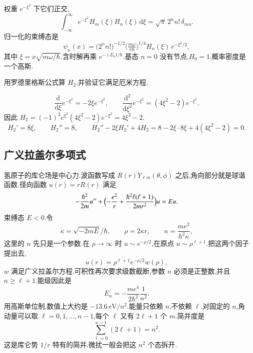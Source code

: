 权重 $e^{-\xi^2}$ 下它们正交,
\begin{equation}
  \int_{-\infty}^{\infty} e^{-\xi^2} H_m(\xi) H_n(\xi)\,\mathrm{d}\xi
  =\sqrt{\pi}\, 2^n n!\, \delta_{mn}.
\end{equation}
归一化的束缚态是
\begin{equation}
  \psi_n(x)
  =\bigl(2^n n!\bigr)^{-1/2}
    \bigl(\tfrac{m\omega}{\pi\hbar}\bigr)^{1/4}
    H_n(\xi)\, e^{-\xi^2/2},
\end{equation}
其中 $\xi=x\sqrt{m\omega/\hbar}$.含时解再乘 $e^{-\imath E_n t/\hbar}$.基态 $n=0$ 没有节点,$H_0=1$,概率密度是一个高斯.

\begin{example}
用罗德里格斯公式算 $H_2$,并验证它满足厄米方程.
\end{example}
\begin{solution}
\begin{equation}
  \frac{\mathrm{d}}{\mathrm{d}\xi}e^{-\xi^2}=-2\xi e^{-\xi^2},
  \qquad
  \frac{\mathrm{d}^2}{\mathrm{d}\xi^2}e^{-\xi^2}=(4\xi^2-2)e^{-\xi^2}.
\end{equation}
因此 $H_2=(-1)^2 e^{\xi^2}(4\xi^2-2)e^{-\xi^2}=4\xi^2-2$.
\begin{equation}
  H_2'=8\xi, \qquad H_2''=8,
  \qquad
  H_2''-2\xi H_2'+4 H_2=8-2\xi\cdot 8\xi+4(4\xi^2-2)=0.
\end{equation}
\end{solution}

\subsection{广义拉盖尔多项式}
氢原子的库仑场是中心力.波函数写成 $R(r)Y_{\ell m}(\theta,\phi)$ 之后,角向部分就是球谐函数.径向函数 $u(r)=r R(r)$ 满足
\begin{equation}
  -\frac{\hbar^2}{2m}u''
  +\Bigl(-\frac{e^2}{r}+\frac{\hbar^2\ell(\ell+1)}{2m r^2}\Bigr)u
  =E u.
\end{equation}
束缚态 $E<0$.令
\begin{equation}
  \kappa=\sqrt{-2mE}/\hbar,
  \qquad
  \rho=2\kappa r,
  \qquad
  n=\frac{m e^2}{\hbar^2\kappa},
\end{equation}
这里的 $n$ 先只是一个参数.在 $\rho\to\infty$ 时 $u\sim e^{-\rho/2}$,在原点 $u\sim\rho^{\ell+1}$.把这两个因子提出去,
\begin{equation}
  u(r)=\rho^{\ell+1} e^{-\rho/2} w(\rho),
\end{equation}
$w$ 满足广义拉盖尔方程.可积性再次要求级数截断,参数 $n$ 必须是正整数,并且 $n\geq\ell+1$.能级因此是
\begin{equation}
  E_n=-\frac{m e^4}{2\hbar^2}\frac{1}{n^2}.
\end{equation}
用高斯单位制,数值上大约是 $-13.6\,\mathrm{eV}/n^2$.能量只依赖 $n$,不依赖 $\ell$.对固定的 $n$,角动量可以取 $\ell=0,1,\ldots,n-1$,每个 $\ell$ 又有 $2\ell+1$ 个 $m$.简并度是
\begin{equation}
  \sum_{\ell=0}^{n-1}(2\ell+1)=n^2.
\end{equation}
这是库仑势 $1/r$ 特有的简并.微扰一般会把这 $n^2$ 个态拆开.

